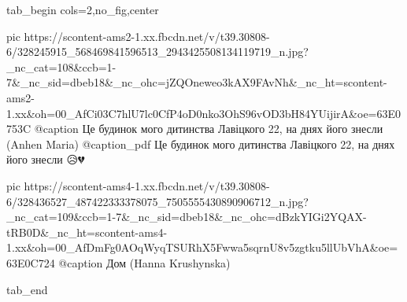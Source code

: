  
 
 
 
 

\clearpage
{}

\ifcmt
  tab_begin cols=2,no_fig,center

     pic https://scontent-ams2-1.xx.fbcdn.net/v/t39.30808-6/328245915_568469841596513_2943425508134119719_n.jpg?_nc_cat=108&ccb=1-7&_nc_sid=dbeb18&_nc_ohc=jZQOneweo3kAX9FAvNh&_nc_ht=scontent-ams2-1.xx&oh=00_AfCi03C7hlU7lc0CfP4oD0nko3OhS96vOD3bH84YUijirA&oe=63E0753C
     @caption Це будинок мого дитинства Лавіцкого 22, на днях його знесли (Anhen Maria)
     @caption_pdf Це будинок мого дитинства Лавіцкого 22, на днях його знесли 😥💔

     pic https://scontent-ams4-1.xx.fbcdn.net/v/t39.30808-6/328436527_487422333378075_7505555430890906712_n.jpg?_nc_cat=109&ccb=1-7&_nc_sid=dbeb18&_nc_ohc=dBzkYIGi2YQAX-tRB0D&_nc_ht=scontent-ams4-1.xx&oh=00_AfDmFg0AOqWyqTSURhX5Fwwa5sqrnU8v5zgtku5llUbVhA&oe=63E0C724
     @caption Дом (Hanna Krushynska)

  tab_end
\fi

